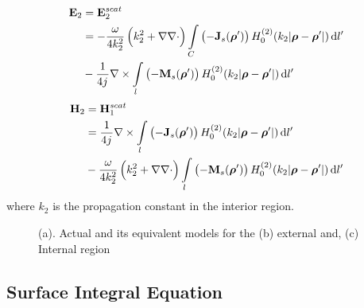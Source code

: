 %
\begin{equation}
  \begin{split}
    \mathbf{E}_2 &= \mathbf{E}_2^{scat} \\
    &=  -\frac{\omega}{4 k_2^2} \left( k_2^2 + \nabla \nabla \cdot \right) \int\limits_{C} \left(-\mathbf{J}_s(\boldsymbol {\rho}')\right) H_0^{(2)}(k_2 |\boldsymbol {\rho} - \boldsymbol {\rho}'|) \mathop{}\!\mathrm{d}{l'} \\
    &- \frac{1}{4 {j}\mkern1mu} \nabla \times \int\limits_{l} \left(-\mathbf{M}_s(\boldsymbol {\rho}')\right) H_0^{(2)}(k_2 |\boldsymbol {\rho} - \boldsymbol {\rho}'|) \mathop{}\!\mathrm{d}{l'}
  \end{split}
  \label{eq:E2scatt}
\end{equation}
%
\begin{equation}
  \begin{split}
    \mathbf{H}_2 &= \mathbf{H}_1^{scat} \\
    &= \frac{1}{4 {j}\mkern1mu} \nabla \times \int\limits_{l} \left(-\mathbf{J}_s(\boldsymbol {\rho}')\right) H_0^{(2)}(k_2 |\boldsymbol {\rho} - \boldsymbol {\rho}'|) \mathop{}\!\mathrm{d}{l'} \\
    &-\frac{\omega}{4 k_2^2} \left( k_2^2 + \nabla \nabla \cdot \right) \int\limits_{l} \left(-\mathbf{M}_s(\boldsymbol {\rho}')\right) H_0^{(2)}(k_2 |\boldsymbol {\rho} - \boldsymbol {\rho}'|) \mathop{}\!\mathrm{d}{l'}
  \end{split}
  \label{eq:H2scatt}
\end{equation}
%
where $k_2$ is the propagation constant in the interior region.
%
\begin{figure}[b!]
  \centering
  \def\svgwidth{1\linewidth}
  
  \caption{(a). Actual and its equivalent models for the (b) external and, (c) Internal region}
  \label{fig:surfeq}
\end{figure}

\subsection{Surface Integral Equation}
%
